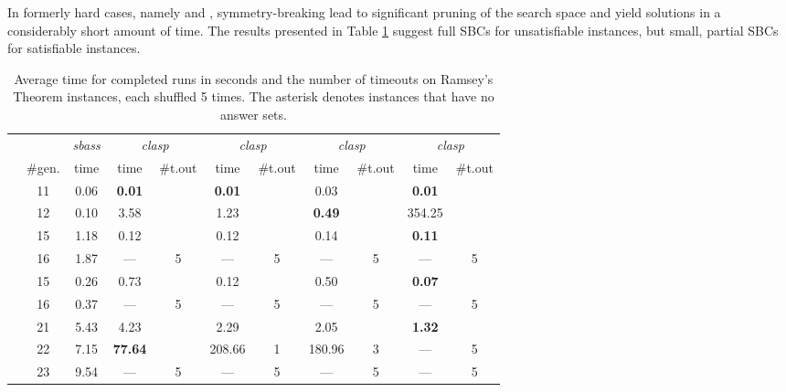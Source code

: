 \documentclass[envcountsame]{llncs}
\newcommand{\systemname}[1]{\emph{#1}}
\begin{document}
In formerly hard cases, namely  and , symmetry-breaking lead to significant pruning of the search space and yield solutions in a considerably short amount of time. The results presented in Table \ref{tab:ramsey} suggest full SBCs for unsatisfiable instances, but small, partial SBCs for satisfiable instances.

\begin{table}
\caption{Average time for completed runs in seconds and the number of timeouts on Ramsey's Theorem instances, each shuffled 5 times. The asterisk denotes instances that have no answer sets.\label{tab:ramsey}}
\centering
\begin{tabular}{lcccccccccc}
\hline\noalign{\smallskip}
 & & \systemname{sbass} & \multicolumn{2}{c}{\systemname{clasp}} & \multicolumn{2}{c}{\systemname{clasp}} & \multicolumn{2}{c}{\systemname{clasp}} & \multicolumn{2}{c}{\systemname{clasp}}\\ 
   & \#gen. & time & time & \#t.out & time & \#t.out & time & \#t.out & time & \#t.out\\
\noalign{\smallskip}
\hline
\noalign{\smallskip}
 & 11 & 0.06 & \textbf{0.01} &  &  \textbf{0.01} &  &  0.03 &  &  \textbf{0.01} &  \\
 & 12 & 0.10 &  3.58 &  &  1.23 &  &  \textbf{0.49} &  &354.25 &  \\
 & 15 & 1.18 &  0.12 &  &  0.12 &  &  0.14 &  &  \textbf{0.11} &  \\
 & 16 & 1.87 & ---   & 5&  ---  & 5& ---   & 5& ---   & 5\\
 & 15 & 0.26 &  0.73 &  &  0.12 &  &  0.50 &  &  \textbf{0.07} &  \\
 & 16 & 0.37 & ---   & 5&  ---  & 5& ---   & 5& ---   & 5\\
 & 21 & 5.43 &  4.23 &  &  2.29 &  &  2.05 &  &  \textbf{1.32} &  \\
 & 22 & 7.15 & \textbf{77.64} &  &208.66 & 1&180.96 & 3& ---   & 5\\
 & 23 & 9.54 & ---   & 5& ---   & 5& ---   & 5& ---   & 5\\
\hline
\end{tabular}
\end{table}
\end{document}
